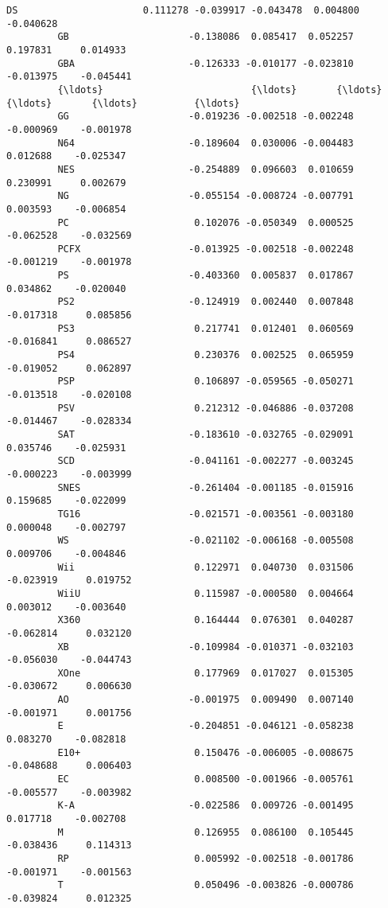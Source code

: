 \documentclass[11pt]{article}
\begin{document}
\begin{Verbatim}[commandchars=\\\{\}]
         DS                      0.111278 -0.039917 -0.043478  0.004800    -0.040628   
         GB                     -0.138086  0.085417  0.052257  0.197831     0.014933   
         GBA                    -0.126333 -0.010177 -0.023810 -0.013975    -0.045441   
         {\ldots}                          {\ldots}       {\ldots}       {\ldots}       {\ldots}          {\ldots}   
         GG                     -0.019236 -0.002518 -0.002248 -0.000969    -0.001978   
         N64                    -0.189604  0.030006 -0.004483  0.012688    -0.025347   
         NES                    -0.254889  0.096603  0.010659  0.230991     0.002679   
         NG                     -0.055154 -0.008724 -0.007791  0.003593    -0.006854   
         PC                      0.102076 -0.050349  0.000525 -0.062528    -0.032569   
         PCFX                   -0.013925 -0.002518 -0.002248 -0.001219    -0.001978   
         PS                     -0.403360  0.005837  0.017867  0.034862    -0.020040   
         PS2                    -0.124919  0.002440  0.007848 -0.017318     0.085856   
         PS3                     0.217741  0.012401  0.060569 -0.016841     0.086527   
         PS4                     0.230376  0.002525  0.065959 -0.019052     0.062897   
         PSP                     0.106897 -0.059565 -0.050271 -0.013518    -0.020108   
         PSV                     0.212312 -0.046886 -0.037208 -0.014467    -0.028334   
         SAT                    -0.183610 -0.032765 -0.029091  0.035746    -0.025931   
         SCD                    -0.041161 -0.002277 -0.003245 -0.000223    -0.003999   
         SNES                   -0.261404 -0.001185 -0.015916  0.159685    -0.022099   
         TG16                   -0.021571 -0.003561 -0.003180  0.000048    -0.002797   
         WS                     -0.021102 -0.006168 -0.005508  0.009706    -0.004846   
         Wii                     0.122971  0.040730  0.031506 -0.023919     0.019752   
         WiiU                    0.115987 -0.000580  0.004664  0.003012    -0.003640   
         X360                    0.164444  0.076301  0.040287 -0.062814     0.032120   
         XB                     -0.109984 -0.010371 -0.032103 -0.056030    -0.044743   
         XOne                    0.177969  0.017027  0.015305 -0.030672     0.006630   
         AO                     -0.001975  0.009490  0.007140 -0.001971     0.001756   
         E                      -0.204851 -0.046121 -0.058238  0.083270    -0.082818   
         E10+                    0.150476 -0.006005 -0.008675 -0.048688     0.006403   
         EC                      0.008500 -0.001966 -0.005761 -0.005577    -0.003982   
         K-A                    -0.022586  0.009726 -0.001495  0.017718    -0.002708   
         M                       0.126955  0.086100  0.105445 -0.038436     0.114313   
         RP                      0.005992 -0.002518 -0.001786 -0.001971    -0.001563   
         T                       0.050496 -0.003826 -0.000786 -0.039824     0.012325   
         

\end{Verbatim}
\end{document}
